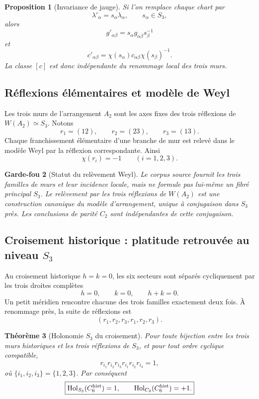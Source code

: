 \documentclass[11pt,a4paper]{article}
\newtheorem{theorem}{Théorème}[section]
\newtheorem{proposition}[theorem]{Proposition}
\newtheorem{guardrail}[theorem]{Garde-fou}
\begin{document}
\begin{proposition}[Invariance de jauge]\label{prop:v16-gauge}
Si l'on remplace chaque chart par
\[
 \lambda'_\alpha=s_\alpha\lambda_\alpha,
 \qquad s_\alpha\in S_3,
\]
alors
\[
 g'_{\alpha\beta}
 =
 s_\alpha g_{\alpha\beta}s_\beta^{-1}
\]
et
\[
 c'_{\alpha\beta}
 =
 \chi(s_\alpha)c_{\alpha\beta}\chi(s_\beta)^{-1}.
\]
La classe $[c]$ est donc indépendante du renommage local des trois murs.
\end{proposition}

\subsection{Réflexions élémentaires et modèle de Weyl}

Les trois murs de l'arrangement $A_2$ sont les axes fixes des trois réflexions de $W(A_2)\simeq S_3$. Notons
\[
 r_1=(12),\qquad
 r_2=(23),\qquad
 r_3=(13).
\]
Chaque franchissement élémentaire d'une branche de mur est relevé dans le modèle Weyl par la réflexion correspondante. Ainsi
\[
 \chi(r_i)=-1
 \qquad(i=1,2,3).
\]

\begin{guardrail}[Statut du relèvement Weyl]
Le corpus source fournit les trois familles de murs et leur incidence locale, mais ne formule pas lui-même un fibré principal $S_3$. Le relèvement par les trois réflexions de $W(A_2)$ est une construction canonique du modèle d'arrangement, unique à conjugaison dans $S_3$ près. Les conclusions de parité $C_2$ sont indépendantes de cette conjugaison.
\end{guardrail}

\subsection{Croisement historique : platitude retrouvée au niveau \texorpdfstring{$S_3$}{S3}}

Au croisement historique $h=k=0$, les six secteurs sont séparés cycliquement par les trois droites complètes
\[
 h=0,\qquad k=0,\qquad h+k=0.
\]
Un petit méridien rencontre chacune des trois familles exactement deux fois. À renommage près, la suite de réflexions est
\[
 (r_1,r_2,r_3,r_1,r_2,r_3).
\]

\begin{theorem}[Holonomie $S_3$ du croisement]\label{thm:v16-crossing-S3}
Pour toute bijection entre les trois murs historiques et les trois réflexions de $S_3$, et pour tout ordre cyclique compatible,
\begin{equation}\label{eq:v16-crossing-S3}
 \boxed{
 r_{i_1}r_{i_2}r_{i_3}
 r_{i_1}r_{i_2}r_{i_3}
 =
 1,}
\end{equation}
où $\{i_1,i_2,i_3\}=\{1,2,3\}$.
Par conséquent
\[
 \boxed{
 \operatorname{Hol}_{S_3}(C_6^{\rm hist})=1,
 \qquad
 \operatorname{Hol}_{C_2}(C_6^{\rm hist})=+1.}
\]
\end{theorem}
\end{document}

